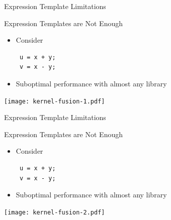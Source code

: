 

\begin{frame}[fragile]{Expression Template Limitations}

 \begin{block}{Expression Templates are Not Enough}
  \begin{itemize}
   \item Consider
    \begin{lstlisting}
 u = x + y;
 v = x - y;
    \end{lstlisting}
   \item Suboptimal performance with almost any library
  \end{itemize}
 \end{block}
 
 \begin{center}
  \texttt{[image: kernel-fusion-1.pdf]}
 \end{center}


\end{frame}



\begin{frame}[fragile]{Expression Template Limitations}

 \begin{block}{Expression Templates are Not Enough}
  \begin{itemize}
   \item Consider
    \begin{lstlisting}
 u = x + y;
 v = x - y;
    \end{lstlisting}
   \item Suboptimal performance with almost any library
  \end{itemize}
 \end{block}
 
 \begin{center}
  \texttt{[image: kernel-fusion-2.pdf]}
 \end{center}


\end{frame}


